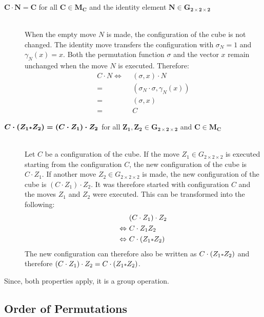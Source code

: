 \documentclass[12pt,a4paper]{article}
\theoremstyle{custom}
\newcommand{\Gtwo}{\ensuremath{G_{2\times 2\times 2}}}
\begin{document}
\begin{description}
\item [$\boldsymbol{C \cdot N = C}$ for all $\boldsymbol{C \in M_C}$ and the identity element $\boldsymbol{N \in \Gtwo}$]
\ \\
When the empty move $N$ is made, the configuration of the cube is not changed. The identity move transfers the configuration with $\sigma_N=1$ and $\gamma_N(x)=x$. Both the permutation function $\sigma$ and the vector $x$ remain unchanged when the move $N$ is executed. \newpage Therefore:
\begin{align*}
 C \cdot N
\Leftrightarrow \ \ & (\sigma, x) \cdot N \\
= \ \ & (\sigma_N \cdot \sigma, \gamma_N(x)) \\
= \ \ & (\sigma, x) \\
= \ \ & C
\end{align*}

\item [$\boldsymbol{C \cdot (Z_1 \mathlarger{\scriptstyle*} Z_2) = (C \cdot Z_1) \cdot Z_2}$ for all $\boldsymbol{Z_1, Z_2 \in \Gtwo}$ and $\boldsymbol{C \in M_C}$]
\ \\
Let $C$ be a configuration of the cube. If the move $Z_1 \in \Gtwo$ is executed starting from the configuration $C$, the new configuration of the cube is $C \cdot Z_1$. If another move $Z_2 \in \Gtwo$ is made, the new configuration of the cube is $(C \cdot Z_1) \cdot Z_2$.
It was therefore started with configuration $C$ and the moves $Z_1$ and $Z_2$ were executed. This can be transformed into the following:
\begin{align*}
& (C \cdot Z_1) \cdot Z_2 \\
\Leftrightarrow \ & C \cdot Z_1Z_2 \\
\Leftrightarrow \ & C \cdot (Z_1 \mathlarger{\scriptstyle*} Z_2)
\end{align*}
The new configuration can therefore also be written as $C \cdot (Z_1 \mathlarger{\scriptstyle*} Z_2)$ and therefore $(C \cdot Z_1) \cdot Z_2 = C \cdot (Z_1 \mathlarger{\scriptstyle*} Z_2)$.
\end{description}
\nopagebreak
Since, both properties apply, it is a group operation. 

\subsection{Order of Permutations}
\end{document}
